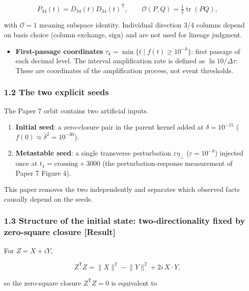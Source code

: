 \documentclass[
  a4paper,
]{article}
\providecommand{\tightlist}{%
  \setlength{\itemsep}{0pt}\setlength{\parskip}{0pt}}
\begin{document}
\[P_{34}(t)=D_{34}(t)D_{34}(t)^{\mathsf T},\qquad \mathcal O(P,Q)=\tfrac12\operatorname{tr}(PQ),\]

with \(\mathcal O=1\) meaning subspace identity. Individual direction
3/4 columns depend on basis choice (column exchange, sign) and are not
used for lineage judgment.

\begin{itemize}
\tightlist
\item
  \textbf{First-passage coordinates}
  \(\tau_k=\min\{t\mid f(t)\ge 10^{-k}\}\): first passage of each
  decimal level. The interval amplification rate is defined as
  \(\ln 10/\Delta\tau\). These are coordinates of the amplification
  process, not event thresholds.
\end{itemize}

\subsubsection{1.2 The two explicit seeds}\label{the-two-explicit-seeds}

The Paper 7 orbit contains two artificial inputs.

\begin{enumerate}
\def\labelenumi{\arabic{enumi}.}
\tightlist
\item
  \textbf{Initial seed}: a zero-closure pair in the parent kernel added
  at \(\delta=10^{-15}\) (\(f(0)\approx\delta^2=10^{-30}\)).
\item
  \textbf{Metastable seed}: a single transverse perturbation
  \(\varepsilon\eta_\perp\) (\(\varepsilon=10^{-8}\)) injected once at
  \(t_1=\mathrm{crossing}+3000\) (the perturbation-response measurement
  of Paper 7 Figure 4).
\end{enumerate}

This paper removes the two independently and separates which observed
facts causally depend on the seeds.

\subsubsection{1.3 Structure of the initial state: two-directionality
fixed by zero-square closure
{[}Result{]}}\label{structure-of-the-initial-state-two-directionality-fixed-by-zero-square-closure-result}

For \(Z=X+iY\),

\[Z^{\mathsf T}Z=\lVert X\rVert^2-\lVert Y\rVert^2+2i\,X\cdot Y,\]

so the zero-square closure \(Z^{\mathsf T}Z=0\) is equivalent to
\end{document}
